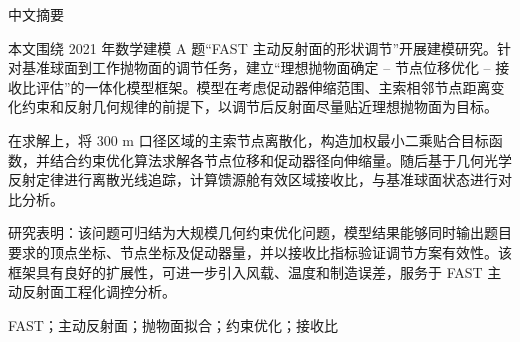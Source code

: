 \thispagestyle{plain}
{}
\centerline{\heiti 中文摘要}

\linespread{1.4}\bigskip

本文围绕 2021 年数学建模 A 题“FAST 主动反射面的形状调节”开展建模研究。针对基准球面到工作抛物面的调节任务，建立“理想抛物面确定 -- 节点位移优化 -- 接收比评估”的一体化模型框架。模型在考虑促动器伸缩范围、主索相邻节点距离变化约束和反射几何规律的前提下，以调节后反射面尽量贴近理想抛物面为目标。

在求解上，将 300 m 口径区域的主索节点离散化，构造加权最小二乘贴合目标函数，并结合约束优化算法求解各节点位移和促动器径向伸缩量。随后基于几何光学反射定律进行离散光线追踪，计算馈源舱有效区域接收比，与基准球面状态进行对比分析。

研究表明：该问题可归结为大规模几何约束优化问题，模型结果能够同时输出题目要求的顶点坐标、节点坐标及促动器量，并以接收比指标验证调节方案有效性。该框架具有良好的扩展性，可进一步引入风载、温度和制造误差，服务于 FAST 主动反射面工程化调控分析。

\bigskip
{}
FAST；主动反射面；抛物面拟合；约束优化；接收比
